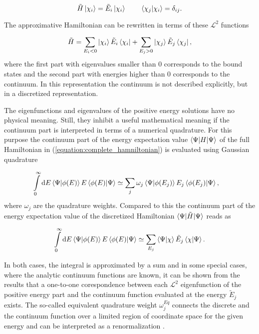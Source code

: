 \begin{equation}
  \tilde{H} \ket{\chi_i} = \tilde{E}_i \ket{\chi_i} \quad\quad  \,
  \braket{\chi_j|\chi_i} = \delta_{ij} .
\end{equation}

The approximative Hamiltonian can be rewritten in terms of these $\mathcal{L}^2$
functions

\begin{equation} \label{equation:discrete_hamiltonian}
  \tilde{H} = \sum\limits_{E_i<0} \ket{\chi_i} \tilde{E}_i \bra{\chi_i}
            + \sum\limits_{E_j>0} \ket{\chi_j} \tilde{E}_j \bra{\chi_j}   ,
\end{equation}
where the first part with eigenvalues smaller than 0 corresponds to the
bound states and the second part with energies higher than 0 corresponds to
the continuum. In this representation the continuum is not described explicitly,
but in a discretized representation.

The eigenfunctions and eigenvalues of the positive energy solutions have no physical
meaning. Still, they inhibit a useful
mathematical meaning if the continuum part is interpreted in terms of
a numerical quadrature.
For this purpose the continuum part of the energy expectation value
$\braket{\Psi| H | \Psi}$ of the full Hamiltonian in
(\ref{equation:complete_hamniltonian}) is evaluated using Gaussian quadrature

\begin{align}
  \int\limits_0^\infty \mathrm{d}E \braket{\Psi|\phi(E)} E \braket{\phi(E)|\Psi}
  &\simeq \sum\limits_j \omega_j \braket{\Psi|\phi(E_j)} E_j \braket{\phi(E_j)|\Psi} ,
\end{align}
where  $\omega_j$ are the quadrature weights.
Compared to this the continuum part of the energy expectation
value of the discretized Hamiltonian $\braket{\Psi| \tilde{H} | \Psi}$ reads as

\begin{equation}
  \int\limits_0^\infty \mathrm{d}E \braket{\Psi|\phi(E)} E \braket{\phi(E)|\Psi}
  \simeq \sum\limits_{E_j}  \braket{\Psi|\chi} \tilde{E}_j \braket{\chi|\Psi}   .
\end{equation}

In both cases, the integral is approximated by a sum and in some special cases,
where the analytic continuum functions are known, it can be shown from the results
that a one-to-one corespondence between each $\mathcal{L}^2$
eigenfunction of the positive energy part and the continuum function evaluated
at the energy $\tilde{E}_j$ exists. The so-called equivalent quadrature
weight $\omega_j^{Eq}$ connects the discrete and
the continuum function over a limited region of coordinate space
for the given energy and can be interpreted
as a renormalization \cite{Reinhart79}.


